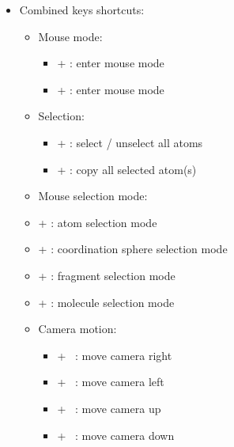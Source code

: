 {\begin{itemize}
\begin{itemize}
\begin{itemize}
\item[] \DArrow\ : rotate down 
\end{itemize}
\item Misc:
\begin{itemize}
\item[] \Esc\ : exit fullscreen mode
\item[] \Spacebar\ : pause / restart spinning
\end{itemize}
\end{itemize}
\newpage
\item Combined keys shortcuts:
\begin{itemize}
\item Mouse mode:
\begin{itemize}
\item[] \Alt +  : enter mouse  mode
\item[] \Alt +  : enter mouse  mode 
\end{itemize}
\item Selection:
\begin{itemize}
\item[] \Ctrl +  : select / unselect all atoms
\item[] \Ctrl +  : copy all selected atom(s)
\end{itemize}
\item Mouse selection mode:
\item[] \Shift + : atom selection mode
\item[] \Shift + : coordination sphere selection mode
\item[] \Shift + : fragment selection mode
\item[] \Shift + : molecule selection mode 
\item Camera motion:
\begin{itemize}
\item[] \Ctrl + \RArrow\ : move camera right
\item[] \Ctrl + \LArrow\ : move camera left
\item[] \Ctrl + \UArrow\ : move camera up
\item[] \Ctrl + \DArrow\ : move camera down

\end{itemize}
\end{itemize}
\end{itemize}}
